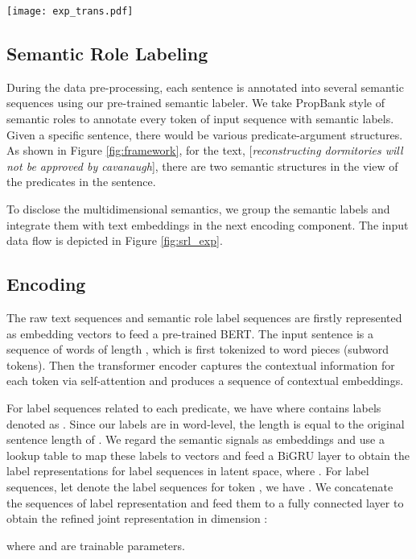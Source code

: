 \documentclass[letterpaper]{article} \usepackage{aaai20}  \usepackage{times}  \usepackage{helvet} \usepackage{courier}  \usepackage[hyphens]{url}  \usepackage{graphicx} \urlstyle{rm} \def\UrlFont{\rm}  \usepackage{graphicx}  \frenchspacing  \usepackage{amssymb}
\begin{document}
\begin{figure*}
	\centering
	\texttt{[image: exp\_trans.pdf]}
	\caption{\label{fig:srl_exp}The input representation flow.}
\end{figure*}

\subsection{Semantic Role Labeling}
During the data pre-processing, each sentence is annotated into several semantic sequences using our pre-trained semantic labeler. We take PropBank style \cite{palmer2005proposition} of semantic roles to annotate every token of input sequence with semantic labels. Given a specific sentence, there would be various predicate-argument structures. As shown in Figure \ref{fig:framework}, for the text, [\emph{reconstructing dormitories will not be approved by cavanaugh}], there are two semantic structures in the view of the predicates in the sentence.

To disclose the multidimensional semantics, we group the semantic labels and integrate them with text embeddings in the next encoding component. The input data flow is depicted in Figure \ref{fig:srl_exp}.


\subsection{Encoding}
The raw text sequences and semantic role label sequences are firstly represented as embedding vectors to feed a pre-trained BERT. The input sentence  is a sequence of words of length , which is first tokenized to word pieces (subword tokens). Then the transformer encoder captures the contextual information for each token via self-attention and produces a sequence of contextual embeddings. 

For  label sequences related to each predicate, we have  where  contains  labels denoted as . Since our labels are in word-level, the length is equal to the original sentence length  of . We regard the semantic signals as embeddings and use a lookup table to map these labels to vectors  and feed a BiGRU layer to obtain the label representations for  label sequences in latent space,  where . For  label sequences, let  denote the label sequences for token , we have . We concatenate the  sequences of label representation and feed them to a fully connected layer to obtain the refined joint representation  in dimension :

where  and  are trainable parameters.
\end{document}
